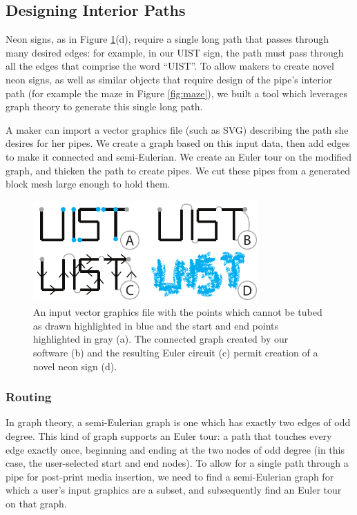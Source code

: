 \subsection{Designing Interior Paths}

Neon signs, as in Figure \ref{fig:tool-process-interior}(d), require a single long path that passes through many desired edges: for example, in our UIST sign, the path must pass through all the edges that comprise the word ``UIST''.  To allow makers to create novel neon signs, as well as similar objects that require design of the pipe's interior path (for example the maze in Figure \ref{fig:maze}), we built a tool which leverages graph theory to generate this single long path.

A maker can import a vector graphics file (such as SVG) describing the path she desires for her pipes.  We create a graph based on this input data, then add edges to make it connected and semi-Eulerian.  We create an Euler tour on the modified graph, and thicken the path to create pipes.    We cut these pipes from a generated block mesh large enough to hold them.

\begin{figure}[h!]
\centering
    \includegraphics[width=3.4in]{figures/interior.pdf}
\caption{An input vector graphics file with the points which cannot be tubed as drawn highlighted in {\color{blue}blue} and the start and end points highlighted in {\color{gray}gray} (a).  The connected graph created by our software (b) and the resulting Euler circuit (c) permit creation of a novel neon sign (d).}
\label{fig:tool-process-interior}
\end{figure}

\subsubsection{Routing}
In graph theory, a semi-Eulerian graph is one which has exactly two edges of odd degree.  This kind of graph supports an Euler tour: a path that touches every edge exactly once, beginning and ending at the two nodes of odd degree (in this case, the user-selected start and end nodes).  To allow for a single path through a pipe for post-print media insertion, we need to find a semi-Eulerian graph for which a user's input graphics are a subset, and subsequently find an Euler tour on that graph.

